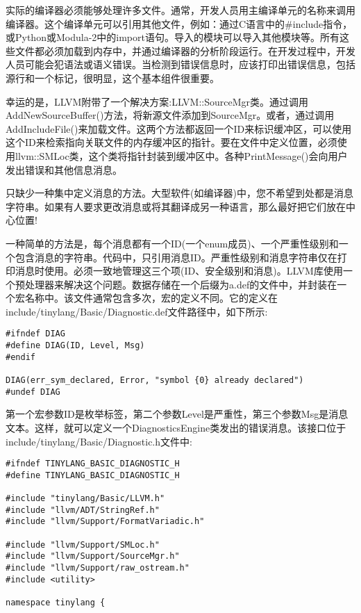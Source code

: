 实际的编译器必须能够处理许多文件。通常，开发人员用主编译单元的名称来调用编译器。这个编译单元可以引用其他文件，例如：通过C语言中的\#include指令，或Python或Modula-2中的import语句。导入的模块可以导入其他模块等。所有这些文件都必须加载到内存中，并通过编译器的分析阶段运行。在开发过程中，开发人员可能会犯语法或语义错误。当检测到错误信息时，应该打印出错误信息，包括源行和一个标记，很明显，这个基本组件很重要。\par

幸运的是，LLVM附带了一个解决方案:LLVM::SourceMgr类。通过调用AddNewSourceBuffer()方法，将新源文件添加到SourceMgr。或者，通过调用AddIncludeFile()来加载文件。这两个方法都返回一个ID来标识缓冲区，可以使用这个ID来检索指向关联文件的内存缓冲区的指针。要在文件中定义位置，必须使用llvm::SMLoc类，这个类将指针封装到缓冲区中。各种PrintMessage()会向用户发出错误和其他信息消息。\par

只缺少一种集中定义消息的方法。大型软件(如编译器)中，您不希望到处都是消息字符串。如果有人要求更改消息或将其翻译成另一种语言，那么最好把它们放在中心位置!\par

一种简单的方法是，每个消息都有一个ID(一个enum成员)、一个严重性级别和一个包含消息的字符串。代码中，只引用消息ID。严重性级别和消息字符串仅在打印消息时使用。必须一致地管理这三个项(ID、安全级别和消息)。LLVM库使用一个预处理器来解决这个问题。数据存储在一个后缀为a.def的文件中，并封装在一个宏名称中。该文件通常包含多次，宏的定义不同。它的定义在include/tinylang/Basic/Diagnostic.def文件路径中，如下所示:\par

\begin{lstlisting}[caption={}]
#ifndef DIAG
#define DIAG(ID, Level, Msg)
#endif

DIAG(err_sym_declared, Error, "symbol {0} already declared")
#undef DIAG
\end{lstlisting}

第一个宏参数ID是枚举标签，第二个参数Level是严重性，第三个参数Msg是消息文本。这样，就可以定义一个DiagnosticsEngine类发出的错误消息。该接口位于include/tinylang/Basic/Diagnostic.h文件中:\par

\begin{lstlisting}[caption={}]
#ifndef TINYLANG_BASIC_DIAGNOSTIC_H
#define TINYLANG_BASIC_DIAGNOSTIC_H

#include "tinylang/Basic/LLVM.h"
#include "llvm/ADT/StringRef.h"
#include "llvm/Support/FormatVariadic.h"

#include "llvm/Support/SMLoc.h"
#include "llvm/Support/SourceMgr.h"
#include "llvm/Support/raw_ostream.h"
#include <utility>

namespace tinylang {
\end{lstlisting}

